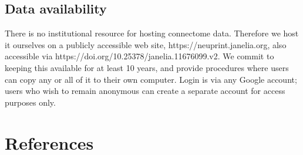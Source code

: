 \documentclass{article}
\begin{document}
\subsection*{Data availability}

There is no institutional resource for hosting connectome data. Therefore we host it ourselves on a publicly accessible web site, https://neuprint.janelia.org, also accessible via https://doi.org/10.25378/janelia.11676099.v2. We commit to keeping this available for at least 10 years, and provide procedures where users can copy any or all of it to their own computer. Login is via any Google account; users who wish to remain anonymous can create a separate account for access purposes only.

\section*{References}
\end{document}
